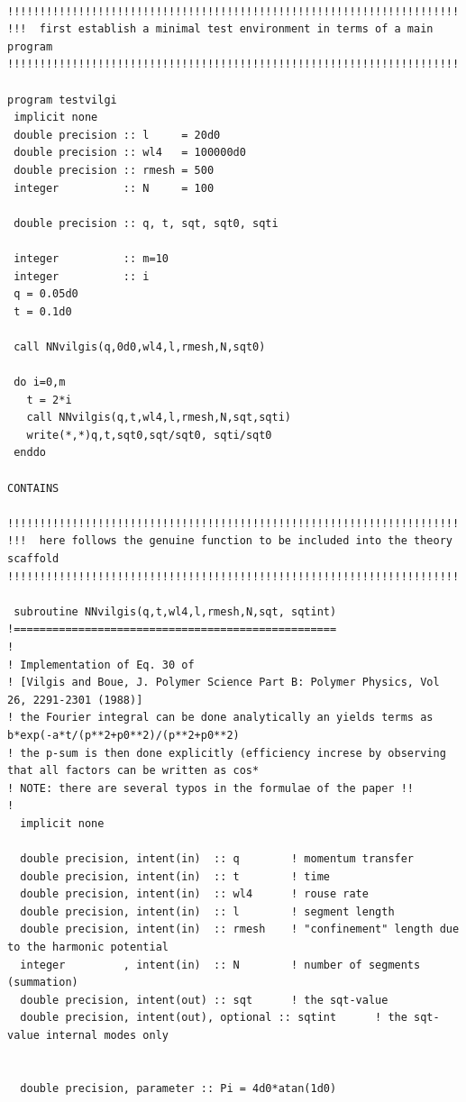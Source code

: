 \documentclass[11pt,fleqn]{book} %
\begin{document}
\tiny
\begin{verbatim}

!!!!!!!!!!!!!!!!!!!!!!!!!!!!!!!!!!!!!!!!!!!!!!!!!!!!!!!!!!!!!!!!!!!!!!!!!!!!!!!!!!!
!!!  first establish a minimal test environment in terms of a main program
!!!!!!!!!!!!!!!!!!!!!!!!!!!!!!!!!!!!!!!!!!!!!!!!!!!!!!!!!!!!!!!!!!!!!!!!!!!!!!!!!!!

program testvilgi
 implicit none
 double precision :: l     = 20d0
 double precision :: wl4   = 100000d0
 double precision :: rmesh = 500
 integer          :: N     = 100

 double precision :: q, t, sqt, sqt0, sqti

 integer          :: m=10
 integer          :: i
 q = 0.05d0
 t = 0.1d0
 
 call NNvilgis(q,0d0,wl4,l,rmesh,N,sqt0)

 do i=0,m
   t = 2*i
   call NNvilgis(q,t,wl4,l,rmesh,N,sqt,sqti)
   write(*,*)q,t,sqt0,sqt/sqt0, sqti/sqt0
 enddo

CONTAINS  

!!!!!!!!!!!!!!!!!!!!!!!!!!!!!!!!!!!!!!!!!!!!!!!!!!!!!!!!!!!!!!!!!!!!!!!!!!!!!!!!!!!
!!!  here follows the genuine function to be included into the theory scaffold
!!!!!!!!!!!!!!!!!!!!!!!!!!!!!!!!!!!!!!!!!!!!!!!!!!!!!!!!!!!!!!!!!!!!!!!!!!!!!!!!!!!

 subroutine NNvilgis(q,t,wl4,l,rmesh,N,sqt, sqtint)
!==================================================
!
! Implementation of Eq. 30 of 
! [Vilgis and Boue, J. Polymer Science Part B: Polymer Physics, Vol 26, 2291-2301 (1988)]
! the Fourier integral can be done analytically an yields terms as b*exp(-a*t/(p**2+p0**2)/(p**2+p0**2)
! the p-sum is then done explicitly (efficiency increse by observing that all factors can be written as cos*
! NOTE: there are several typos in the formulae of the paper !! 
! 
  implicit none

  double precision, intent(in)  :: q        ! momentum transfer
  double precision, intent(in)  :: t        ! time
  double precision, intent(in)  :: wl4      ! rouse rate
  double precision, intent(in)  :: l        ! segment length
  double precision, intent(in)  :: rmesh    ! "confinement" length due to the harmonic potential
  integer         , intent(in)  :: N        ! number of segments (summation)
  double precision, intent(out) :: sqt      ! the sqt-value
  double precision, intent(out), optional :: sqtint      ! the sqt-value internal modes only


  double precision, parameter :: Pi = 4d0*atan(1d0)


\end{verbatim}
\end{document}
